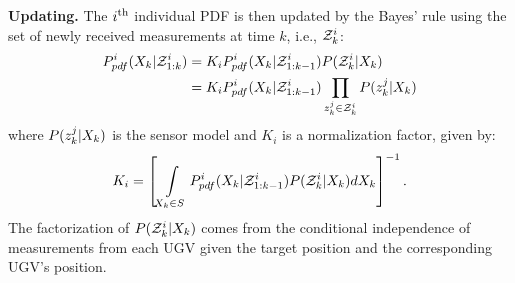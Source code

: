 	\textbf{Updating.}
	The $i^\text{th}$ individual PDF is then updated by the Bayes' rule using the set of newly received measurements at time $k$, i.e., $\mathcal{Z}^i_k$:
		\small\begin{align}\label{eqn:bayes_upd}
			\begin{split}
				P^i_{pdf}(X_k|\mathcal{Z}^i_{1:k})
				&= K_iP^i_{pdf}(X_k|\mathcal{Z}^i_{1:k-1})P(\mathcal{Z}^i_k|X_k)\\
				&=K_iP^i_{pdf}(X_k|\mathcal{Z}^i_{1:k-1})\prod\limits_{z^j_k\in\mathcal{Z}^i_k}P(z^j_k|X_{k})
			\end{split}
		\end{align}\normalsize
	where $P(z^j_k|X_k)$ is the sensor model and $K_i$ is a normalization factor, given by:
	\small\begin{align*}
	K_i=\left[\int\limits_{X_k\in S} P^i_{pdf}(X_k|\mathcal{Z}^i_{1:k-1})P(\mathcal{Z}^i_k|X_k)dX_k\right]^{-1}.
	\end{align*}\normalsize
	The factorization of $P(\mathcal{Z}^i_k|X_k)$ comes from the conditional independence of measurements from each UGV given the target position and the corresponding UGV's position.	
	
